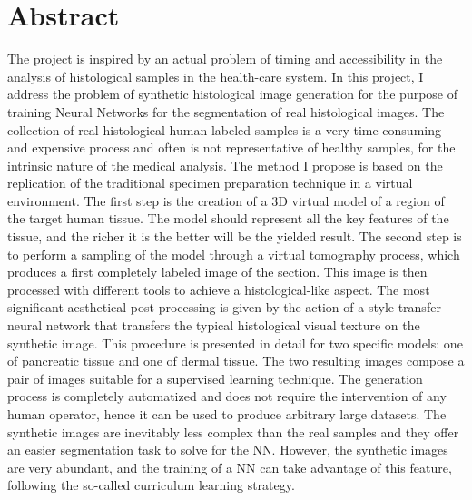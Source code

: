 \chapter*{Abstract}
The project is inspired by an actual problem of timing and accessibility in the analysis of histological samples in the health-care system. In this project, I address the problem of synthetic histological image generation for the purpose of training Neural Networks for the segmentation of real histological images. The collection of real histological human-labeled samples is a very time consuming and expensive process and often is not representative of healthy samples, for the intrinsic nature of the medical analysis. The method I propose is based on the replication of the traditional specimen preparation technique in a virtual environment. The first step is the creation of a 3D virtual model of a region of the target human tissue. The model should represent all the key features of the tissue, and the richer it is the better will be the yielded result. The second step is to perform a sampling of the model through a virtual tomography process, which produces a first completely labeled image of the section. This image is then processed with different tools to achieve a histological-like aspect. The most significant aesthetical post-processing is given by the action of a style transfer neural network that transfers the typical histological visual texture on the synthetic image. This procedure is presented in detail for two specific models: one of pancreatic tissue and one of dermal tissue. The two resulting images compose a pair of images suitable for a supervised learning technique. The generation process is completely automatized and does not require the intervention of any human operator, hence it can be used to produce arbitrary large datasets. The synthetic images are inevitably less complex than the real samples and they offer an easier segmentation task to solve for the NN. However, the synthetic images are very abundant, and the training of a NN can take advantage of this feature, following the so-called curriculum learning strategy.
